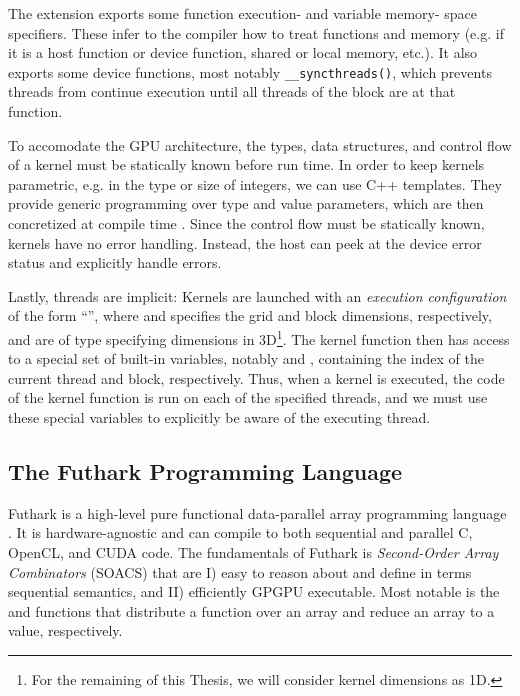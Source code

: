 The extension exports some function execution- and variable memory- space
specifiers. These infer to the compiler how to treat functions and memory
(e.g. if it is a host function or device function, shared or local memory,
etc.). It also exports some device functions, most notably
\texttt{\_\_syncthreads()}, which prevents threads from continue execution until
all threads of the block are at that function.

To accomodate the GPU architecture, the types, data structures, and control flow
of a kernel must be statically known before run time.  In order to keep kernels
parametric, e.g. in the type or size of integers, we can use C++ templates. They
provide generic programming over type and value parameters, which are then
concretized at compile time \cite{stroustrup}. Since the control flow must be
statically known, kernels have no error handling. Instead, the host can peek at
the device error status and explicitly handle errors.

Lastly, threads are implicit: Kernels are launched with an \textit{execution
  configuration} of the form ``'', where
 and  specifies the grid and block dimensions,
respectively, and are of type  specifying dimensions in
3D\footnote{For the remaining of this Thesis, we will consider kernel dimensions
  as 1D.}. The kernel function then has access to a special set of built-in
variables, notably  and , containing the index of
the current thread and block, respectively. Thus, when a kernel is executed, the
code of the kernel function is run on each of the specified threads, and we must
use these special variables to explicitly be aware of the executing thread.

\subsection{The Futhark Programming Language}
\label{subsec:futhark}

Futhark is a high-level pure functional data-parallel array programming language
\cite{futguide} \cite{ParallelProgrammingInFuthark}. It is hardware-agnostic and
can compile to both sequential and parallel C, OpenCL, and CUDA code. The
fundamentals of Futhark is \textit{Second-Order Array Combinators} (SOACS) that
are I) easy to reason about and define in terms sequential semantics, and II)
efficiently GPGPU executable. Most notable is the  and 
functions that distribute a function over an array and reduce an array to a
value, respectively.

